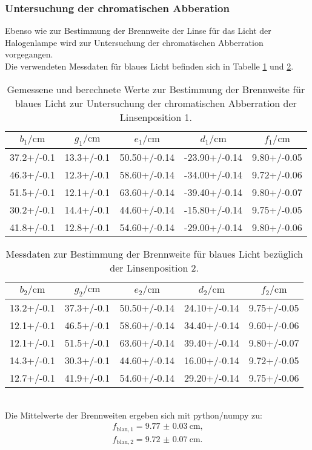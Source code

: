 \subsubsection{Untersuchung der chromatischen Abberation}
Ebenso wie zur Bestimmung der Brennweite der Linse für das Licht der Halogenlampe wird zur Untersuchung der chromatischen Abberration vorgegangen.
\\Die verwendeten Messdaten für blaues Licht befinden sich in Tabelle \ref{tab:blaueins} und \ref{tab:blauzwo}.
\begin{table}
  \caption{Gemessene und berechnete Werte zur Bestimmung der Brennweite für blaues Licht zur Untersuchung der chromatischen Abberration der Linsenposition 1.}
  \label{tab:blaueins}
  \centering
\begin{tabular}{ccccc}
  \toprule
$b_\mathrm{1}/\si{\centi\meter}$ & $g_\mathrm{1}/\si{\centi\meter}$ & $e_\mathrm{1}/\si{\centi\meter}$ & $d_\mathrm{1}/\si{\centi\meter}$ & $f_\mathrm{1}/\si{\centi\meter}$ \\
\midrule
37.2+/-0.1 & 13.3+/-0.1 & 50.50+/-0.14 & -23.90+/-0.14 & 9.80+/-0.05 \\
46.3+/-0.1 & 12.3+/-0.1 & 58.60+/-0.14 & -34.00+/-0.14 & 9.72+/-0.06 \\
51.5+/-0.1 & 12.1+/-0.1 & 63.60+/-0.14 & -39.40+/-0.14 & 9.80+/-0.07 \\
30.2+/-0.1 & 14.4+/-0.1 & 44.60+/-0.14 & -15.80+/-0.14 & 9.75+/-0.05 \\
41.8+/-0.1 & 12.8+/-0.1 & 54.60+/-0.14 & -29.00+/-0.14 & 9.80+/-0.06 \\
\bottomrule
\end{tabular}
\end{table}
\begin{table}
\caption{Messdaten zur Bestimmung der Brennweite für blaues Licht bezüglich der Linsenposition 2.}
  \label{tab:blauzwo}
  \centering
\begin{tabular}{ccccc}
  \toprule
$b_\mathrm{2}/\si{\centi\meter}$ & $g_\mathrm{2}/\si{\centi\meter}$ & $e_\mathrm{2}/\si{\centi\meter}$ & $d_\mathrm{2}/\si{\centi\meter}$ & $f_\mathrm{2}/\si{\centi\meter}$ \\
\midrule
13.2+/-0.1 & 37.3+/-0.1 & 50.50+/-0.14 & 24.10+/-0.14 & 9.75+/-0.05 \\
12.1+/-0.1 & 46.5+/-0.1 & 58.60+/-0.14 & 34.40+/-0.14 & 9.60+/-0.06 \\
12.1+/-0.1 & 51.5+/-0.1 & 63.60+/-0.14 & 39.40+/-0.14 & 9.80+/-0.07 \\
14.3+/-0.1 & 30.3+/-0.1 & 44.60+/-0.14 & 16.00+/-0.14 & 9.72+/-0.05 \\
12.7+/-0.1 & 41.9+/-0.1 & 54.60+/-0.14 & 29.20+/-0.14 & 9.75+/-0.06 \\
\bottomrule
\end{tabular}
\end{table}
\\Die Mittelwerte der Brennweiten ergeben sich mit python/numpy zu:
\begin{gather*}
  f_\mathrm{blau, 1}= \SI{9.77(3)}{\centi\meter} \text{,}\\
  f_\mathrm{blau, 2}= \SI{9.72(7)}{\centi\meter}\text{.}
\end{gather*}



